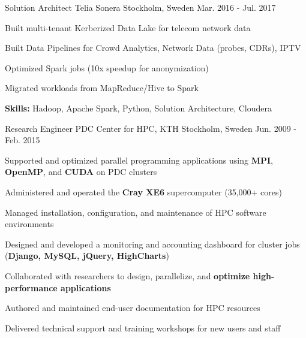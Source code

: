 \begin{cventries}


\cventry
{Solution Architect} %
{Telia Sonera} %
{Stockholm, Sweden} %
{Mar. 2016 - Jul. 2017} %
{ %
\begin{cvitems}
\item Built multi-tenant Kerberized Data Lake for telecom network data
\item Built Data Pipelines for Crowd Analytics, Network Data (probes, CDRs), IPTV 
\item Optimized Spark jobs (10x speedup for anonymization)
\item Migrated workloads from MapReduce/Hive to Spark
\item \textbf{Skills:} Hadoop, Apache Spark, Python, Solution Architecture, Cloudera
\end{cvitems}
}


\cventry
{Research Engineer} %
{PDC Center for HPC, KTH} %
{Stockholm, Sweden} %
{Jun. 2009 - Feb. 2015} %
{ %
\begin{cvitems}
\item Supported and optimized parallel programming applications using \textbf{MPI}, \textbf{OpenMP}, and \textbf{CUDA} on PDC clusters  
\item Administered and operated the \textbf{Cray XE6} supercomputer (35,000+ cores)
\item Managed installation, configuration, and maintenance of HPC software environments
\item Designed and developed a monitoring and accounting dashboard for cluster jobs (\textbf{Django, MySQL, jQuery, HighCharts})
\item Collaborated with researchers to design, parallelize, and \textbf{optimize high-performance applications}
\item Authored and maintained end-user documentation for HPC resources
\item Delivered technical support and training workshops for new users and staff
\end{cvitems}
}


\end{cventries}
